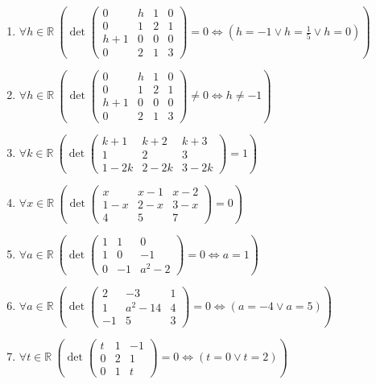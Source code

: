 \documentclass[11pt,a4paper]{article}
\begin{document}
\begin{enumerate}
\item $\displaystyle \forall h \in \mathbb{R}\ \left( \det \begin{pmatrix} 0 & h & 1 & 0 \\ 0 & 1 & 2 & 1 \\ h + 1 & 0 & 0 & 0 \\ 0 & 2 & 1 & 3 \end{pmatrix} = 0 \iff \left( h = -1 \lor h = \frac{1}{5} \lor h = 0 \right) \right)$
\item $\displaystyle \forall h \in \mathbb{R}\ \left( \det \begin{pmatrix} 0 & h & 1 & 0 \\ 0 & 1 & 2 & 1 \\ h + 1 & 0 & 0 & 0 \\ 0 & 2 & 1 & 3 \end{pmatrix} \neq 0 \iff h \neq -1 \right)$
\item $\displaystyle \forall k \in \mathbb{R}\ \left( \det \begin{pmatrix} k + 1 & k + 2 & k + 3 \\ 1 & 2 & 3 \\ 1 - 2k & 2 - 2k & 3 - 2k \end{pmatrix} = 1 \right)$
\item $\displaystyle \forall x \in \mathbb{R}\ \left( \det \begin{pmatrix} x & x - 1 & x - 2 \\ 1 - x & 2 - x & 3 - x \\ 4 & 5 & 7 \end{pmatrix} = 0 \right)$
\item $\displaystyle \forall a \in \mathbb{R}\ \left( \det \begin{pmatrix} 1 & 1 & 0 \\ 1 & 0 & -1 \\ 0 & -1 & a^{2} - 2 \end{pmatrix} = 0 \iff a = 1 \right)$
\item $\displaystyle \forall a \in \mathbb{R}\ \left( \det \begin{pmatrix} 2 & -3 & 1 \\ 1 & a^{2} - 14 & 4 \\ -1 & 5 & 3 \end{pmatrix} = 0 \iff \left( a = -4 \lor a = 5 \right) \right)$
\item $\displaystyle \forall t \in \mathbb{R}\ \left( \det \begin{pmatrix} t & 1 & -1 \\ 0 & 2 & 1 \\ 0 & 1 & t \end{pmatrix} = 0 \iff \left( t = 0 \lor t = 2 \right) \right)$

\end{enumerate}
\end{document}
